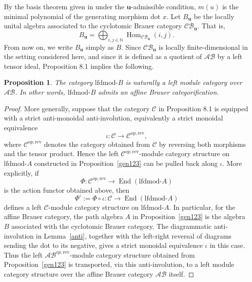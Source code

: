 \documentclass[a4,10pt]{amsart}
\numberwithin{equation}{section}
\def\Hom{\operatorname{Hom}}
\def\End{\operatorname{End}}
\newtheorem{Prop}[Theorem]{Proposition}
\theoremstyle{definition}
\newcommand{\AB}{\mathcal{AB}}
\begin{document}
By the basis theorem given in \cite[Theorem~C]{RS-cyc} under the $\mathbf u$-admissible condition, $m(u)$ is the minimal polynomial of the generating morphism dot $x$.   Let $B_\mathbf u$ be the locally unital algebra associated to the cyclotomic Brauer category 
$\mathcal {CB}_{\mathbf u}$. 
That is,
$$B_\mathbf u=\bigoplus_{i,j\in \mathbb N}\Hom_{\mathcal {CB}_\mathbf u}(i,j).$$
 From now on, we write $B_\mathbf u$ simply as $B$. 
Since \(\mathcal{CB}_{\mathbf u}\) is locally finite-dimensional in the
setting considered here, and since it is defined as a quotient of
\(\mathcal{AB}\) by a left tensor ideal, Proposition 8.1 implies the
following.






\begin{Prop}
\label{prop:modues}
The category
$\mathrm{lfdmod}\text{-}B$ is naturally a left
module category over $\mathcal{AB}$. In other words,  $\text{lfdmod-}B$
 admits an affine Brauer categorification.  
 \end{Prop}
\begin{proof} More generally, suppose that
the category $\mathcal C$ in Proposition
8.1 is equipped with a strict anti-monoidal anti-involution,
equivalently a strict monoidal equivalence
\[
\iota:\mathcal C\longrightarrow \mathcal C^{op,\mathrm{rev}},
\]
where $\mathcal C^{op,\mathrm{rev}}$ denotes the category obtained from $\mathcal C$ by reversing both morphisms and the tensor product. Hence the left $\mathcal C^{op,\mathrm{rev}}$-module category structure on $\mathrm{lfdmod}\text{-}A$ constructed in Proposition~\ref{gen123} can be pulled back along $\iota$. More explicitly, if
\[
\Phi:\mathcal C^{op,\mathrm{rev}}\longrightarrow
\End(\mathrm{lfdmod}\text{-}A)
\]
is the action functor obtained above, then
\[
\Phi^\iota:=\Phi\circ\iota:
\mathcal C\longrightarrow
\End(\mathrm{lfdmod}\text{-}A)
\]
defines a left $\mathcal C$-module category structure on $\mathrm{lfdmod}\text{-}A$.
In particular, for the affine Brauer category, the path algebra $A$ in Proposition~\ref{gen123} is the algebra $B$ associated with the cyclotomic Brauer category.  
The diagrammatic anti-involution in Lemma~\ref{anti}, together with the left-right reversal of diagrams sending the dot to its negative, gives a strict monoidal equivalence  $\iota$ in this case.  Thus the left $\AB^{op,\mathrm{rev}}$-module category structure obtained from Proposition~\ref{gen123} is transported, via this anti-involution, to a left module category structure over the affine Brauer category $\AB$ itself.
\end{proof}
\end{document}
